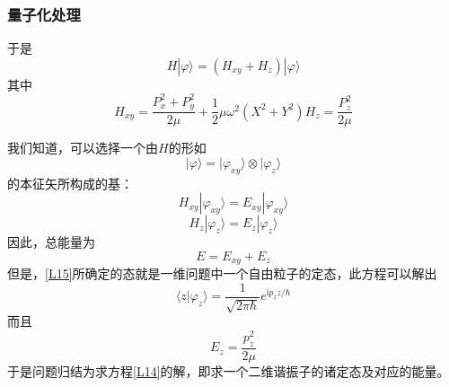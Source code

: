 \documentclass[]{article}
\begin{document}
\subsubsection{量子化处理}
于是
\begin{equation}
	H|\varphi\rangle=(H_{xy}+H_z)|\varphi\rangle
\end{equation}
其中
\begin{subequations}
	\begin{equation}
		H_{xy}=\dfrac{P_x^2+P_y^2}{2\mu}+\dfrac{1}{2}\mu\omega^2(X^2+Y^2)
	\end{equation}
	\begin{equation}
		H_z=\dfrac{P_z^2}{2\mu}
	\end{equation}
\end{subequations}

我们知道，可以选择一个由$H$的形如
\begin{equation}
	|\varphi\rangle=|\varphi_{xy}\rangle\otimes|\varphi_z\rangle
\end{equation}
的本征矢所构成的基：
\begin{equation}
	H_{xy}|\varphi_{xy}\rangle=E_{xy}|\varphi_{xy}\rangle
	\label{L14}
\end{equation}
\begin{equation}
	H_z|\varphi_z\rangle=E_z|\varphi_z\rangle
	\label{L15}
\end{equation}
因此，总能量为
\begin{equation}
	E=E_{xy}+E_z
\end{equation}
但是，\eqref{L15}所确定的态就是一维问题中一个自由粒子的定态，此方程可以解出
\begin{equation}
	\langle z|\varphi_z\rangle=\dfrac{1}{\sqrt{2\pi\hbar}}e^{\mathrm{i}p_zz/\hbar}
\end{equation}
而且
\begin{equation}
	E_z=\dfrac{p_z^2}{2\mu}
\end{equation}
于是问题归结为求方程\eqref{L14}的解，即求一个二维谐振子的诸定态及对应的能量。
\end{document}
